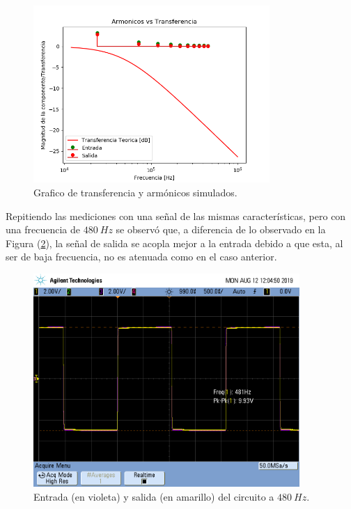 \documentclass[a4paper]{article}
\begin{document}
\begin{figure}[H]
	\centering
	\includegraphics[width=0.8\textwidth]{ArmonicosVsTransferencia}
\caption{Grafico de transferencia y armónicos simulados.}
	\label{fig:aromincosvstransf}
\end{figure}

Repitiendo las mediciones con una señal de las mismas características, pero con una frecuencia de $ 480 \ Hz $ se observó que, a diferencia de lo observado en la Figura (\ref{fig:medicion2}), la señal de salida se acopla mejor a la entrada debido a que esta, al ser de baja frecuencia, no es atenuada como en el caso anterior.

\begin{figure}[H]
	\centering
	\includegraphics[width=0.9\textwidth , trim={0.7cm 6.25cm  0 3.5cm},clip]{scope_3}
\caption{Entrada (en violeta) y salida (en amarillo) del circuito a $ 480 \ Hz $.}
	\label{fig:medicion2}
\end{figure}
\end{document}
